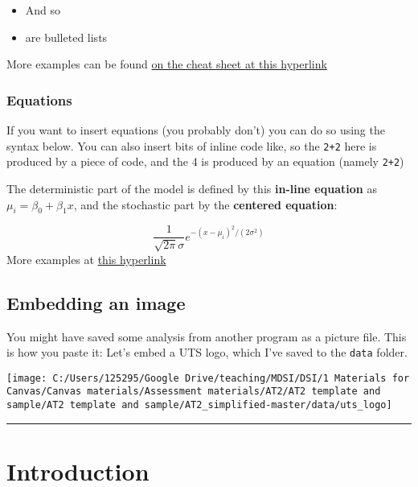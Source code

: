 \documentclass[
]{article}
\providecommand{\tightlist}{%
  \setlength{\itemsep}{0pt}\setlength{\parskip}{0pt}}
\begin{document}
\begin{itemize}
\tightlist
\item
  And so
\item
  are bulleted lists
\end{itemize}

More examples can be found
\href{https://www.rstudio.com/wp-content/uploads/2016/03/rmarkdown-cheatsheet-2.0.pdf}{on
the cheat sheet at this hyperlink}

\hypertarget{equations}{%
\subsubsection{Equations}\label{equations}}

If you want to insert equations (you probably don't) you can do so using
the syntax below. You can also insert bits of inline code like, so the
\texttt{2+2} here is produced by a piece of code, and the 4 is produced
by an equation (namely \texttt{2+2})

The deterministic part of the model is defined by this \textbf{in-line
equation} as \(\mu_i = \beta_0 + \beta_1x\), and the stochastic part by
the \textbf{centered equation}:

\[ \frac{1}{\sqrt{2\pi}\sigma}e^{-(x-\mu_i)^2/(2\sigma^2)} \] More
examples at
\href{https://www.statpower.net/Content/310/R\%20Stuff/SampleMarkdown.html}{this
hyperlink}

\hypertarget{embedding-an-image}{%
\subsection{Embedding an image}\label{embedding-an-image}}

You might have saved some analysis from another program as a picture
file. This is how you paste it: Let's embed a UTS logo, which I've saved
to the \texttt{data} folder.

\texttt{[image: C:/Users/125295/Google Drive/teaching/MDSI/DSI/1 Materials for Canvas/Canvas materials/Assessment materials/AT2/AT2 template and sample/AT2 template and sample/AT2\_simplified-master/data/uts\_logo]}

\begin{center}\rule{0.5\linewidth}{0.5pt}\end{center}

\hypertarget{introduction}{%
\section{Introduction}\label{introduction}}
\end{document}
